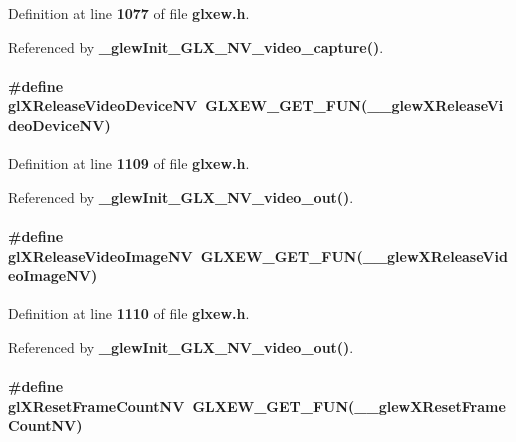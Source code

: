 Definition at line {\bf 1077} of file {\bf glxew.\+h}.



Referenced by {\bf \+\_\+glew\+Init\+\_\+\+G\+L\+X\+\_\+\+N\+V\+\_\+video\+\_\+capture()}.

\paragraph[{gl\+X\+Release\+Video\+Device\+NV}]{\setlength{\rightskip}{0pt plus 5cm}\#define gl\+X\+Release\+Video\+Device\+NV~{\bf G\+L\+X\+E\+W\+\_\+\+G\+E\+T\+\_\+\+F\+UN}({\bf \+\_\+\+\_\+glew\+X\+Release\+Video\+Device\+NV})}\label{glxew_8h_a88cdd5b603be54761d5e7d62032afcaf}


Definition at line {\bf 1109} of file {\bf glxew.\+h}.



Referenced by {\bf \+\_\+glew\+Init\+\_\+\+G\+L\+X\+\_\+\+N\+V\+\_\+video\+\_\+out()}.

\paragraph[{gl\+X\+Release\+Video\+Image\+NV}]{\setlength{\rightskip}{0pt plus 5cm}\#define gl\+X\+Release\+Video\+Image\+NV~{\bf G\+L\+X\+E\+W\+\_\+\+G\+E\+T\+\_\+\+F\+UN}({\bf \+\_\+\+\_\+glew\+X\+Release\+Video\+Image\+NV})}\label{glxew_8h_a37076887ae0f214a02c719f017d2cf13}


Definition at line {\bf 1110} of file {\bf glxew.\+h}.



Referenced by {\bf \+\_\+glew\+Init\+\_\+\+G\+L\+X\+\_\+\+N\+V\+\_\+video\+\_\+out()}.

\paragraph[{gl\+X\+Reset\+Frame\+Count\+NV}]{\setlength{\rightskip}{0pt plus 5cm}\#define gl\+X\+Reset\+Frame\+Count\+NV~{\bf G\+L\+X\+E\+W\+\_\+\+G\+E\+T\+\_\+\+F\+UN}({\bf \+\_\+\+\_\+glew\+X\+Reset\+Frame\+Count\+NV})}\label{glxew_8h_a5c3447098da06c7359e15fd54d1aa581}


